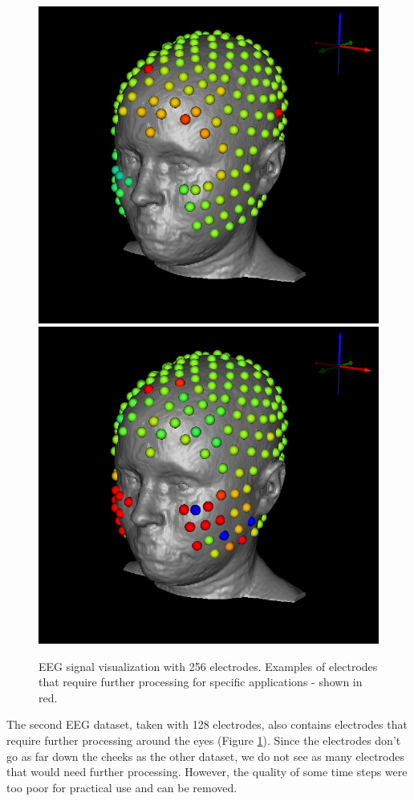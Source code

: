 \begin{figure}[H]
\begin{center}
\includegraphics[width=.49\textwidth]{Figures/eeg_1}
\includegraphics[width=.49\textwidth]{Figures/eeg_2}
\caption{EEG signal visualization with 256 electrodes. Examples of electrodes that require further processing for specific applications - shown in red.}
\label{fig:eegvis}
\end{center}
\end{figure}

The second EEG dataset, taken with 128 electrodes, also contains electrodes that require further processing around the eyes (Figure \ref{fig:eegvis}). Since the electrodes don't go as far down the cheeks as the other dataset, we do not see as many electrodes that would need further processing. However, the quality of some time steps were too poor for practical use and can be removed. %

